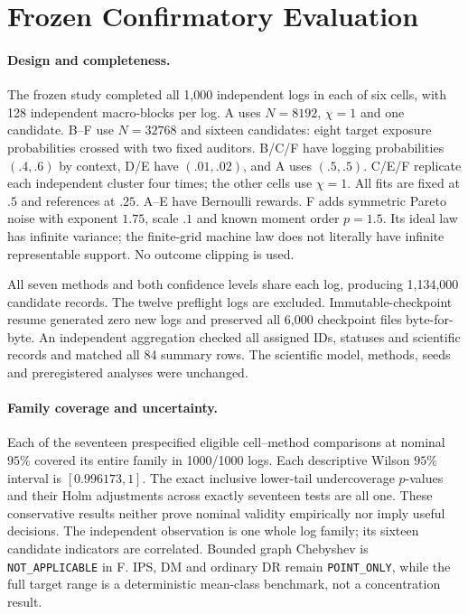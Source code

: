 \section{Frozen Confirmatory Evaluation}
\label{sec:experiments}
\paragraph{Design and completeness.}
The frozen study completed all 1,000 independent logs in each of six cells, with 128 independent macro-blocks per log. A uses $N=8192$, $\chi=1$ and one candidate. B--F use $N=32768$ and sixteen candidates: eight target exposure probabilities crossed with two fixed auditors. B/C/F have logging probabilities $(.4,.6)$ by context, D/E have $(.01,.02)$, and A uses $(.5,.5)$. C/E/F replicate each independent cluster four times; the other cells use $\chi=1$. All fits are fixed at $.5$ and references at $.25$. A--E have Bernoulli rewards. F adds symmetric Pareto noise with exponent $1.75$, scale $.1$ and known moment order $p=1.5$. Its ideal law has infinite variance; the finite-grid machine law does not literally have infinite representable support. No outcome clipping is used.

All seven methods and both confidence levels share each log, producing 1,134,000 candidate records. The twelve preflight logs are excluded. Immutable-checkpoint resume generated zero new logs and preserved all 6,000 checkpoint files byte-for-byte. An independent aggregation checked all assigned IDs, statuses and scientific records and matched all 84 summary rows. The scientific model, methods, seeds and preregistered analyses were unchanged.

\paragraph{Family coverage and uncertainty.}
Each of the seventeen prespecified eligible cell--method comparisons at nominal $95\%$ covered its entire family in 1000/1000 logs. Each descriptive Wilson $95\%$ interval is $[0.996173,1]$. The exact inclusive lower-tail undercoverage $p$-values and their Holm adjustments across exactly seventeen tests are all one. These conservative results neither prove nominal validity empirically nor imply useful decisions. The independent observation is one whole log family; its sixteen candidate indicators are correlated. Bounded graph Chebyshev is \texttt{NOT\_APPLICABLE} in F. IPS, DM and ordinary DR remain \texttt{POINT\_ONLY}, while the full target range is a deterministic mean-class benchmark, not a concentration result.

